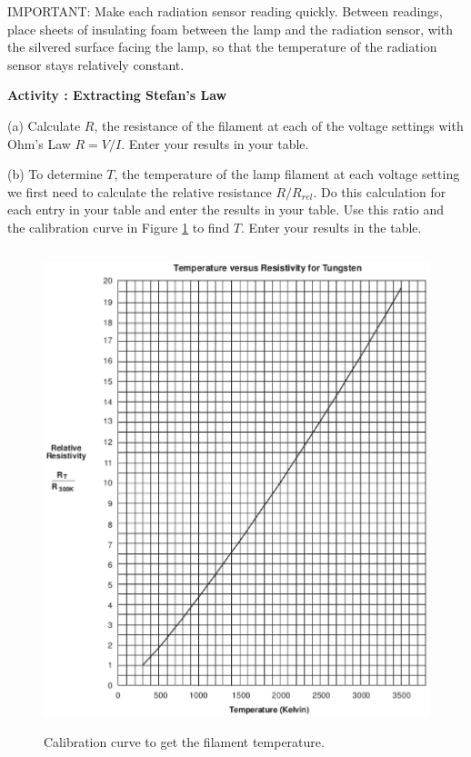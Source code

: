 IMPORTANT: Make each radiation sensor reading quickly. Between readings, place sheets
of insulating foam between the lamp and the radiation sensor, with the silvered surface facing the
lamp, so that the temperature of the radiation sensor stays relatively constant.

\textbf{Activity : Extracting Stefan's Law}

(a) Calculate $R$, the resistance of the filament at each of the voltage settings with Ohm's Law $R = V/I$.
 Enter your results in your table.

(b) To determine $T$, the temperature of the
lamp filament at each voltage setting we first need to calculate the relative resistance $R/R_{rel}$.
Do this calculation for each entry in your table and enter the results in your table.
Use this ratio and the calibration curve in Figure \ref{calibration} to find $T$. Enter your results in the table.

\begin{figure}[hbt]
\begin{center}
\includegraphics[height=5.5in]{stefansLaw/stefansLawFig2d.eps}
\caption{Calibration curve to get the filament temperature.}\label{calibration}
\end{center}
\end{figure}

